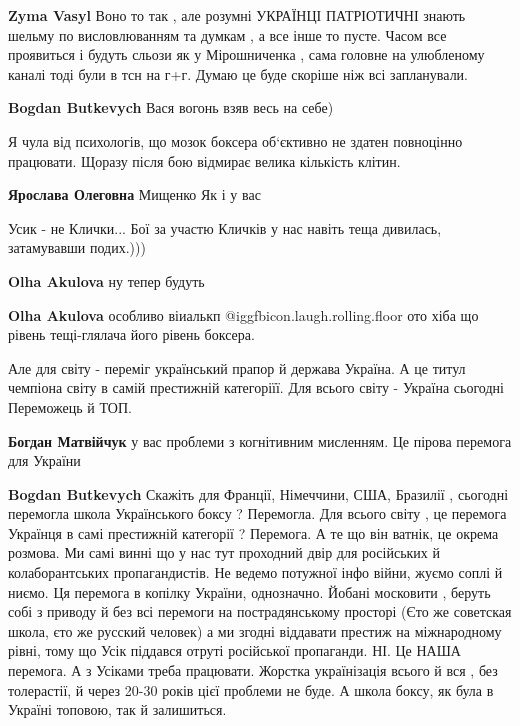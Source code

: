 \begin{itemize}
\begin{itemize}
\textbf{Zyma Vasyl} Воно то так , але розумні УКРАЇНЦІ ПАТРІОТИЧНІ знають шельму по висловлюванням та думкам , а все інше то пусте. Часом все проявиться і будуть сльози як у Мірошниченка , сама головне на улюбленому каналі тоді були в тсн на г+г. Думаю це буде скоріше ніж всі запланували.

\textbf{Bogdan Butkevych} Вася вогонь взяв весь на себе)
\end{itemize} %


Я чула від психологів, що мозок боксера об‘єктивно не здатен повноцінно
працювати. Щоразу після бою відмирає велика кількість клітин.

\begin{itemize} %
\textbf{Ярослава Олеговна} Мищенко Як і у вас
\end{itemize} %

Усик - не Клички... Бої за участю Кличків у нас навіть теща дивилась,
затамувавши подих.)))

\begin{itemize} %
\textbf{Olha Akulova} ну тепер будуть

\textbf{Olha Akulova} особливо віиалькп @igg{fbicon.laugh.rolling.floor} ото хіба що рівень тещі-глялача його рівень боксера.
\end{itemize} %


Але для світу - переміг український прапор й держава Україна. А це титул
чемпіона світу в самій престижній категоріїї. Для всього світу - Україна
сьогодні Переможець й ТОП.

\begin{itemize} %
\textbf{Богдан Матвійчук} у вас проблеми з когнітивним мисленням. Це пірова перемога для України

\textbf{Bogdan Butkevych} Скажіть для Франції, Німеччини, США, Бразилії ,
сьогодні перемогла школа Українського боксу ? Перемогла. Для всього світу , це
перемога Українця в самі престижній категорії ? Перемога. А те що він ватнік,
це окрема розмова. Ми самі винні що у нас тут проходний двір для російських й
колаборантських пропагандистів. Не ведемо потужної інфо війни, жуємо соплі й
ниємо. Ця перемога в копілку України, однозначно. Йобані московити , беруть
собі з приводу й без всі перемоги на пострадянському просторі (Єто же советская
школа, єто же русский человек) а ми згодні віддавати престиж на міжнародному
рівні, тому що Усік піддався отруті російської пропаганди. НІ. Це НАША
перемога. А з Усіками треба працювати. Жорстка українізація всього й вся , без
толерастії, й через 20-30 років цієї проблеми не буде. А школа боксу, як була в
Україні топовою, так й залишиться.


\end{itemize}
\end{itemize}

